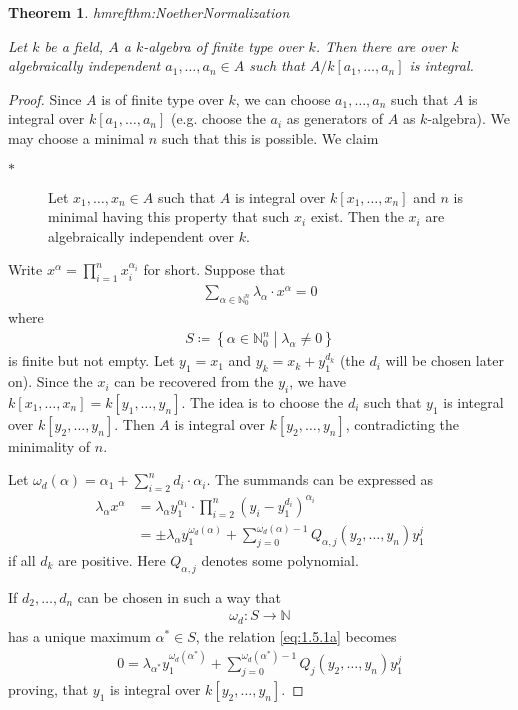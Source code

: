 \documentclass[DIV=14,parskip=full,pointednumbers]{scrartcl}
\theoremstyle{cthm}
\newtheorem{thm}{Theorem}[subsection]
\theoremstyle{cdef}
\newcommand{\lbl}[1]{
	\label{#1}
	\edef\dummy{\curthm}
	\expandafter\xdef\csname thmref#1\endcsname{\dummy}
}
\newcommand{\IN}{\mathbb{N}}
\newcommand{\longto}{\longrightarrow}
\newcommand{\ldotspam}{,\ldots,}
\begin{document}
\begin{thm}\lbl{thm:NoetherNormalization}
 Let $k$ be a field, $A$ a $k$-algebra of finite type over $k$. Then there are over $k$ algebraically independent $a_1\ldotspam a_n\in A$ such that $A/k[a_1\ldotspam a_n]$ is integral.
\end{thm}
\begin{proof}
 Since $A$ is of finite type over $k$, we can choose $a_1,\ldots, a_n$ such that $A$ is integral over $k[a_1,\ldots, a_n]$ (e.g. choose the $a_i$ as generators of $A$ as $k$-algebra). We may choose a minimal $n$ such that this is possible. We claim 
 \begin{description}
  \item [$\ast$] Let $x_1,\ldots, x_n\in A$ such that $A$ is integral over $k[x_1,\ldots,x_n]$ and $n$ is minimal having this property that such $x_i$ exist. Then the $x_i$ are algebraically independent over $k$.
 \end{description}
Write $x^\alpha = \prod_{i=1}^n x_i^{\alpha_i}$ for short. Suppose that
\begin{align*}
\sum_{\alpha\in\IN_0^n} \lambda_\alpha \cdot x^\alpha =0\label{eq:1.5.1a}\tag{\#}
\end{align*}
where 
\begin{align*}
 S\coloneqq \left\{\alpha\in\IN_0^n\middle| \lambda_\alpha\neq 0\right\}
\end{align*}
 is finite but not empty. Let $y_1=x_1$ and $y_k = x_k +y_1^{d_k}$ (the $d_i$ will be chosen later on). Since the $x_i$ can be recovered from the $y_i$, we have $k[x_1,\ldots,x_n] = k[y_1,\ldots,y_n]$. The idea is to choose the $d_i$ such that $y_1$ is integral over $k[y_2,\ldots,y_n]$. Then $A$ is integral over $k[y_2,\ldots,y_n]$, contradicting the minimality of $n$. 

Let $\omega_d(\alpha) =\alpha_1 +\sum_{i=2}^nd_i\cdot \alpha_i$. The summands can be expressed as 
\begin{align*}
 \lambda_\alpha x^\alpha &= \lambda_\alpha y_1^{\alpha_1} \cdot\prod_{i=2}^n \left(y_i - y_1^{d_i}\right)^{\alpha_i} \\
 &= \pm \lambda_\alpha y_1^{\omega_d(\alpha)} + \sum_{j=0}^{\omega_d(\alpha)-1} Q_{\alpha,j}(y_2,\ldots, y_n) y_1^j
\end{align*}
if all $d_k$ are positive. Here $Q_{\alpha, j}$ denotes some polynomial. 

If $d_2,\ldots, d_n$ can be chosen in such a way that
\begin{align*}
 \omega_d: S\longto \IN
\end{align*}
has a unique maximum $\alpha^\ast \in S$, the relation \ref{eq:1.5.1a} becomes
\begin{align*}
 0 = \lambda_{\alpha^\ast} y_1^{\omega_d(\alpha^\ast)} +\sum_{j=0}^{\omega_d(\alpha^\ast)-1} Q_j(y_2,\ldots,y_n)y_1^j
\end{align*}
proving, that $y_1$ is integral over $k[y_2,\ldots,y_n]$. 


\end{proof}
\end{document}

